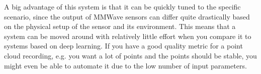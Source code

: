 A big advantage of this system is that it can be quickly tuned to the specific scenario, since the output of MMWave sensors can differ quite drastically based on the physical setup of the sensor and its environment.
This means that a system can be moved around with relatively little effort when you compare it to systems based on deep learning.
If you have a good quality metric for a point cloud recording, e.g. you want a lot of points and the points should be stable, you might even be able to automate it due to the low number of input parameters.







